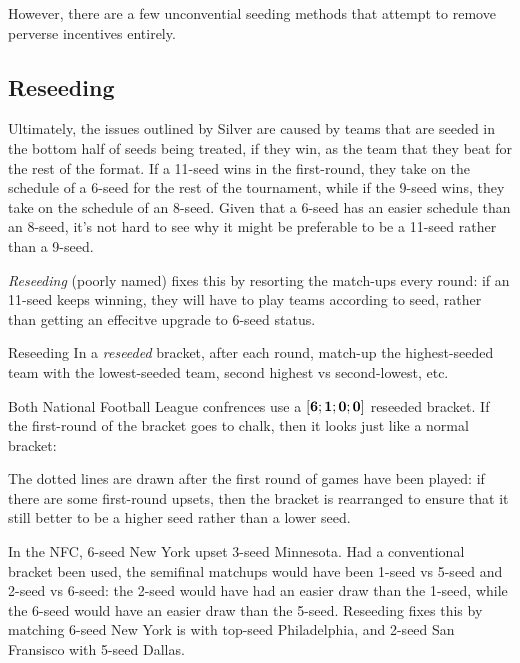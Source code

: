 \documentclass[../main.tex]{subfiles}
\begin{document}
However, there are a few unconvential seeding methods that attempt to remove perverse incentives entirely.

\subsection{Reseeding}

Ultimately, the issues outlined by Silver are caused by teams that are seeded in the bottom half of seeds being treated, if they win, as the team that they beat for the rest of the format. If a 11-seed wins in the first-round, they take on the schedule of a 6-seed for the rest of the tournament, while if the 9-seed wins, they take on the schedule of an 8-seed. Given that a 6-seed has an easier schedule than an 8-seed, it's not hard to see why it might be preferable to be a 11-seed rather than a 9-seed.

\textit{Reseeding} (poorly named) fixes this by resorting the match-ups every round: if an 11-seed keeps winning, they will have to play teams according to seed, rather than getting an effecitve upgrade to 6-seed status.

\begin{definition}{Reseeding}{}
    In a \textit{reseeded} bracket, after each round, match-up the highest-seeded team with the lowest-seeded team, second highest vs second-lowest, etc.
\end{definition}

Both National Football League confrences use a $\mathbf{[6; 1; 0; 0]}$ reseeded bracket. If the first-round of the bracket goes to chalk, then it looks just like a normal bracket:


The dotted lines are drawn after the first round of games have been played: if there are some first-round upsets, then the bracket is rearranged to ensure that it still better to be a higher seed rather than a lower seed.


In the NFC, 6-seed New York upset 3-seed Minnesota. Had a conventional bracket been used, the semifinal matchups would have been 1-seed vs 5-seed and 2-seed vs 6-seed: the 2-seed would have had an easier draw than the 1-seed, while the 6-seed would have an easier draw than
 the 5-seed. Reseeding fixes this by matching 6-seed New York is with top-seed Philadelphia, and 2-seed San Fransisco with 5-seed Dallas.
\end{document}
